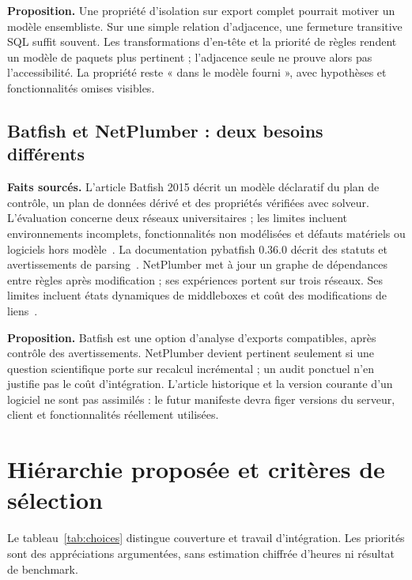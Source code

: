 \documentclass[11pt,a4paper]{article}
\begin{document}
\textbf{Proposition.} Une propriété d'isolation sur export complet pourrait
motiver un modèle ensembliste. Sur une simple relation d'adjacence, une fermeture
transitive SQL suffit souvent. Les transformations d'en-tête et la priorité
de règles rendent un modèle de paquets plus pertinent ; l'adjacence seule
ne prouve alors pas l'accessibilité. La propriété reste « dans le modèle
fourni », avec hypothèses et fonctionnalités omises visibles.

\subsection{Batfish et NetPlumber : deux besoins différents}
\textbf{Faits sourcés.} L'article Batfish 2015 décrit un modèle déclaratif
du plan de contrôle, un plan de données dérivé et des propriétés vérifiées avec
solveur. L'évaluation concerne deux réseaux universitaires ; les limites
incluent environnements incomplets, fonctionnalités non modélisées et défauts
matériels ou logiciels hors modèle~\cite{batfish}. La documentation pybatfish
0.36.0 décrit des statuts et avertissements de parsing~\cite{batfishdocs}.
NetPlumber met à jour un graphe de dépendances entre règles après modification ;
ses expériences portent sur trois réseaux. Ses limites incluent états dynamiques
de middleboxes et coût des modifications de liens~\cite{netplumber}.

\textbf{Proposition.} Batfish est une option d'analyse d'exports compatibles,
après contrôle des avertissements. NetPlumber devient pertinent seulement si
une question scientifique porte sur recalcul incrémental ; un audit ponctuel
n'en justifie pas le coût d'intégration. L'article historique et la version
courante d'un logiciel ne sont pas assimilés : le futur manifeste devra figer
versions du serveur, client et fonctionnalités réellement utilisées.

\section{Hiérarchie proposée et critères de sélection}
Le tableau~\ref{tab:choices} distingue couverture et travail d'intégration.
Les priorités sont des appréciations argumentées, sans estimation chiffrée
d'heures ni résultat de benchmark.
\end{document}
